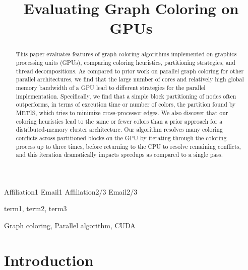 \documentclass[preprint]{sigplanconf}
\begin{document}
\copyrightdata{[to be supplied]}


\title{Evaluating Graph Coloring on GPUs}

           {Affiliation1}
           {Email1}
           {Affiliation2/3}
           {Email2/3}

\maketitle

\begin{abstract}
This paper evaluates features of graph coloring algorithms implemented on graphics processing units (GPUs), comparing coloring heuristics, partitioning strategies, and thread decompositions.  As compared to prior work on parallel graph coloring for other parallel architectures, we find that the large number of cores and relatively high global memory bandwidth of a GPU lead to different strategies for the parallel implementation.  Specifically, we find that a simple block partitioning of nodes often outperforms, in terms of execution time or number of colors, the partition found by METIS, which tries to minimize cross-processor edges.  We also discover that our coloring heuristics lead to the same or fewer colors than a prior approach for a distributed-memory cluster architecture.  Our algorithm resolves many coloring conflicts across partitioned blocks on the GPU by iterating through the coloring process up to three times, before returning to the CPU to resolve remaining conflicts, and this iteration dramatically impacts speedups as compared to a single pass. 

\end{abstract}


\terms
term1, term2, term3

\keywords
Graph coloring, Parallel algorithm, CUDA

\section{Introduction}
\end{document}

